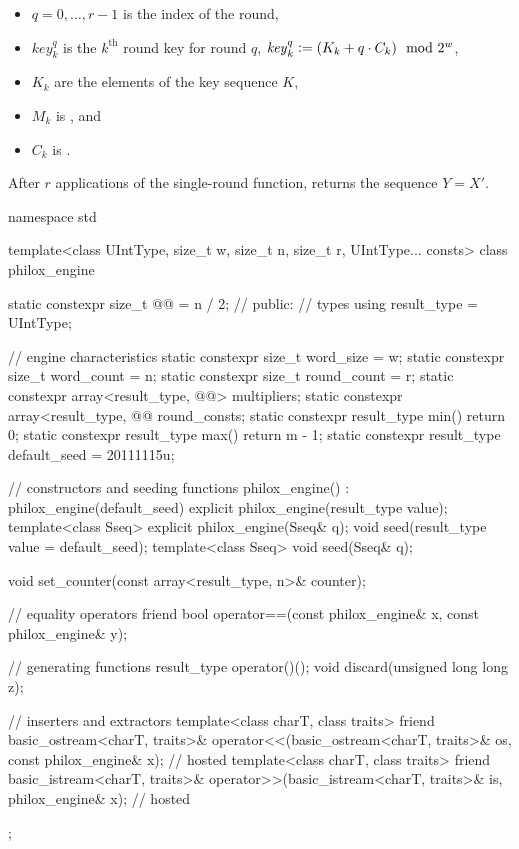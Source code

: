 \begin{itemize}
\begin{itemize}
  \item
  $q = 0, \dotsc, r - 1$ is the index of the round,

  \item
  $\mathit{key}^q_k$ is the $k^\text{th}$ round key for round $q$,
  $\mathit{key}^q_k \mathrel{\mathop:}= (K_k + q \cdot C_k) \mod 2^w$,

  \item
  $K_k$ are the elements of the key sequence $K$,

  \item
  $M_k$ is , and

  \item
  $C_k$ is .
  \end{itemize}
\end{itemize}

\pnum
After $r$ applications of the single-round function,
 returns the sequence $Y = X'$.

%
%
\begin{codeblock}
namespace std {
  template<class UIntType, size_t w, size_t n, size_t r, UIntType... consts>
  class philox_engine {
    static constexpr size_t @@ = n / 2;   // \expos
  public:
    // types
    using result_type = UIntType;

    // engine characteristics
    static constexpr size_t word_size = w;
    static constexpr size_t word_count = n;
    static constexpr size_t round_count = r;
    static constexpr array<result_type, @@> multipliers;
    static constexpr array<result_type, @@ round_consts;
    static constexpr result_type min() { return 0; }
    static constexpr result_type max() { return m - 1; }
    static constexpr result_type default_seed = 20111115u;

    // constructors and seeding functions
    philox_engine() : philox_engine(default_seed) {}
    explicit philox_engine(result_type value);
    template<class Sseq> explicit philox_engine(Sseq& q);
    void seed(result_type value = default_seed);
    template<class Sseq> void seed(Sseq& q);

    void set_counter(const array<result_type, n>& counter);

    // equality operators
    friend bool operator==(const philox_engine& x, const philox_engine& y);

    // generating functions
    result_type operator()();
    void discard(unsigned long long z);

    // inserters and extractors
    template<class charT, class traits>
      friend basic_ostream<charT, traits>&
        operator<<(basic_ostream<charT, traits>& os, const philox_engine& x);   // hosted
    template<class charT, class traits>
      friend basic_istream<charT, traits>&
        operator>>(basic_istream<charT, traits>& is, philox_engine& x);         // hosted
  };
}
\end{codeblock}

